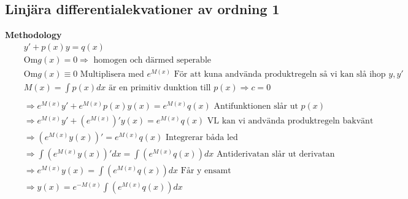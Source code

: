 \subsection{Linjära differentialekvationer av ordning 1}
\textbf{Methodology}  
\begin{align*}
  &\quad  y'+p(x)y = q(x)  \\
  &\quad  \text{Om} g(x)=0 \Rightarrow \text{ homogen och därmed seperable} \\
  &\quad  \text{Om} g(x)\equiv0 \text{ Multiplisera med } e^{M(x)} \text{ För att kuna andvända produktregeln
  så vi kan slå ihop } y, y' \\
  &\quad  M(x)= \int p(x)dx \text{ är en primitiv dunktion till } p(x) \Rightarrow c=0 \\
  &\quad  \\
  &\quad  \Rightarrow e^{M(x)}y'+e^{M(x)}p(x)y(x) = e^{M(x)}q(x) \text{ Antifunktionen slår ut } p(x) \\
  &\quad  \Rightarrow e^{M(x)}y'+(e^{M(x)})'y(x) = e^{M(x)}q(x)
  \text{ VL kan vi andvända produktregeln bakvänt} \\
  &\quad  \Rightarrow (e^{M(x)}y(x))' = e^{M(x)}q(x) \text{ Integrerar båda led} \\
  &\quad  \Rightarrow \int(e^{M(x)}y(x))'dx = \int(e^{M(x)}q(x))dx \text{ Antiderivatan slår ut derivatan } \\
  &\quad  \Rightarrow e^{M(x)}y(x) = \int(e^{M(x)}q(x))dx \text{ Får y ensamt } \\
  &\quad  \Rightarrow y(x) = e^{-M(x)} \int(e^{M(x)}q(x))dx \\
  &\quad  \\
\end{align*}

